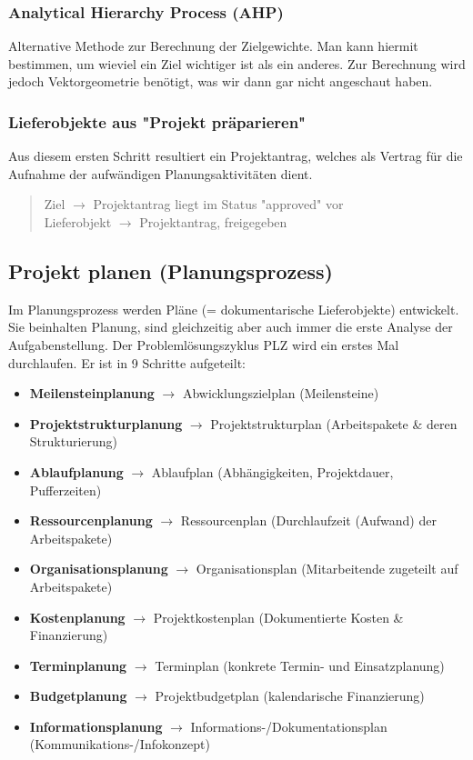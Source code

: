 \documentclass[a4paper]{article}
\begin{document}
\newpage
	
		\subsubsection{Analytical Hierarchy Process (AHP)}
		
		Alternative Methode zur Berechnung der Zielgewichte.
		Man kann hiermit bestimmen, um wieviel ein Ziel wichtiger ist als ein anderes.
		Zur Berechnung wird jedoch Vektorgeometrie benötigt, was wir dann gar nicht angeschaut haben.
		
		\subsubsection{Lieferobjekte aus "Projekt präparieren"}
		
		Aus diesem ersten Schritt resultiert ein Projektantrag, welches als Vertrag für die Aufnahme der aufwändigen Planungsaktivitäten dient.
		
		\begin{quote}
			Ziel $\rightarrow$ Projektantrag liegt im Status "approved" vor\\
			Lieferobjekt $\rightarrow$ Projektantrag, freigegeben
		\end{quote}
	
	\subsection{Projekt planen (Planungsprozess)}
	
	Im Planungsprozess werden Pläne (= dokumentarische Lieferobjekte) entwickelt.
	Sie beinhalten Planung, sind gleichzeitig aber auch immer die erste Analyse der Aufgabenstellung.
	Der Problemlösungszyklus PLZ wird ein erstes Mal durchlaufen.
	Er ist in 9 Schritte aufgeteilt:
	
	\begin{itemize}
		\item \textbf{Meilensteinplanung} $\rightarrow$ Abwicklungszielplan (Meilensteine)
		\item \textbf{Projektstrukturplanung} $\rightarrow$ Projektstrukturplan (Arbeitspakete \& deren Strukturierung)
		\item \textbf{Ablaufplanung} $\rightarrow$ Ablaufplan (Abhängigkeiten, Projektdauer, Pufferzeiten)
		\item \textbf{Ressourcenplanung} $\rightarrow$ Ressourcenplan (Durchlaufzeit (Aufwand) der Arbeitspakete)
		\item \textbf{Organisationsplanung} $\rightarrow$ Organisationsplan (Mitarbeitende zugeteilt auf Arbeitspakete)
		\item \textbf{Kostenplanung} $\rightarrow$ Projektkostenplan (Dokumentierte Kosten \& Finanzierung)
		\item \textbf{Terminplanung} $\rightarrow$ Terminplan (konkrete Termin- und Einsatzplanung)
		\item \textbf{Budgetplanung} $\rightarrow$ Projektbudgetplan (kalendarische Finanzierung)
		\item \textbf{Informationsplanung} $\rightarrow$ Informations-/Dokumentationsplan (Kommunikations-/Infokonzept)
	\end{itemize}
\end{document}
